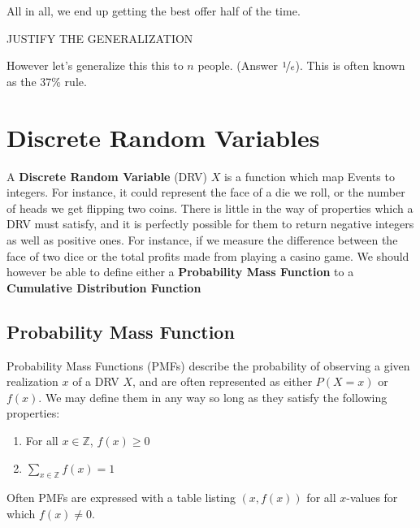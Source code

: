\documentclass{report}
\begin{document}
\\\\

All in all, we end up getting the best offer half of the time.

\todo JUSTIFY THE GENERALIZATION

However let's generalize this this to $n$ people. (Answer $\nicefrac 1e$). This is often known as the 37\% rule. 


\section{Discrete Random Variables}
A \textbf{Discrete Random Variable} (DRV) $X$ is a function which map Events to integers. For instance, it could represent the face of a die we roll, or the number of heads we get flipping two coins. There is little in the way of properties which a DRV must satisfy, and it is perfectly possible for them to return negative integers as well as positive ones. For instance, if we measure the difference between the face of two dice or the total profits made from playing a casino game. We should however be able to define either a \textbf{Probability Mass Function} to a \textbf{Cumulative Distribution Function}

\subsection{Probability Mass Function}
Probability Mass Functions (PMFs) describe the probability of observing a given realization $x$ of a DRV $X$, and are often represented as either $P(X=x)$ or $f(x)$. We may define them in any way so long as they satisfy the following properties:
\begin{enumerate}
    \item For all $x\in \mathbb Z$, $f(x)\ge 0$
    \item $\displaystyle\sum_{x\in\mathbb Z} f(x)=1$
\end{enumerate}
Often PMFs are expressed with a table listing $(x, f(x))$ for all $x$-values for which $f(x)\ne 0$.
\end{document}
